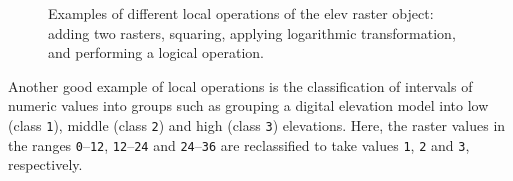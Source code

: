 \documentclass[
  letterpaper,
]{krantz}
\begin{document}
\begin{figure}

\begin{minipage}{0.25\linewidth}



\end{minipage}%
%
\begin{minipage}{0.25\linewidth}



\end{minipage}%
%
\begin{minipage}{0.25\linewidth}



\end{minipage}%
%
\begin{minipage}{0.25\linewidth}



\end{minipage}%

\caption{\label{fig-raster-local-operations}Examples of different local
operations of the elev raster object: adding two rasters, squaring,
applying logarithmic transformation, and performing a logical
operation.}

\end{figure}%

Another good example of local operations is the classification of
intervals of numeric values into groups such as grouping a digital
elevation model into low (class \texttt{1}), middle (class \texttt{2})
and high (class \texttt{3}) elevations. Here, the raster values in the
ranges \texttt{0}--\texttt{12}, \texttt{12}--\texttt{24} and
\texttt{24}--\texttt{36} are reclassified to take values \texttt{1},
\texttt{2} and \texttt{3}, respectively.
\end{document}
